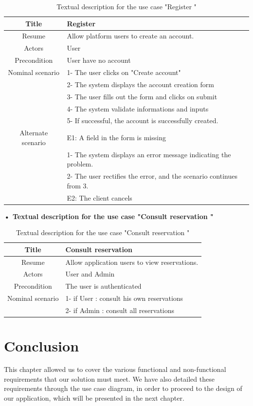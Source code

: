 \begin{table}
    \centering
    \begin{tabular}{|c|l|} \hline 
         Title& Register\\ \hline 
         Resume& Allow platform users to create an account.\\ \hline 
         Actors& User \\ \hline 
         Precondition&User have no account\\\hline \hline 
         Nominal scenario& 1- The user clicks on "Create account"\\ \hline 
 &2- The system displays the account creation form\\ \hline 
 &3- The user fills out the form and clicks on submit\\ \hline 
 &4- The system validate informations and inputs \\ \hline 
 &5- If successful, the account is successfully created.\\\hline \hline 
         Alternate scenario& E1: A field in the form is missing\\ \hline 
 &1- The system displays an error message indicating the problem.\\ \hline 
 &2- The user rectifies the error, and the scenario continues from 3.\\ \hline
 &E2: The client cancels\\\hline
    \end{tabular}
    \caption{Textual description for the use case "Register "}
    \label{Textual description for the use case "Register"}
\end{table}

\textbf{• \textbf{Textual description for the use case "Consult reservation " }}

\begin{table}
    \centering
    \begin{tabular}{|c|l|} \hline 
         Title& Consult reservation\\ \hline 
         Resume& Allow application users to view reservations.\\ \hline 
         Actors& User and Admin\\ \hline 
         Precondition&The user is authenticated\\\hline \hline 
         Nominal scenario& 1- if User : consult his own reservations\\ \hline 
 &2- if Admin : consult all reservations\\\hline
    \end{tabular}
    \caption{Textual description for the use case "Consult reservation "}
    \label{Textual description for the use case "Consult reservation"}
\end{table}


\section{Conclusion}
This chapter allowed us to cover the various functional and non-functional requirements that our solution must meet. We have also detailed these requirements through the use case diagram, in order to proceed to the design of our application, which will be presented in the next chapter. 